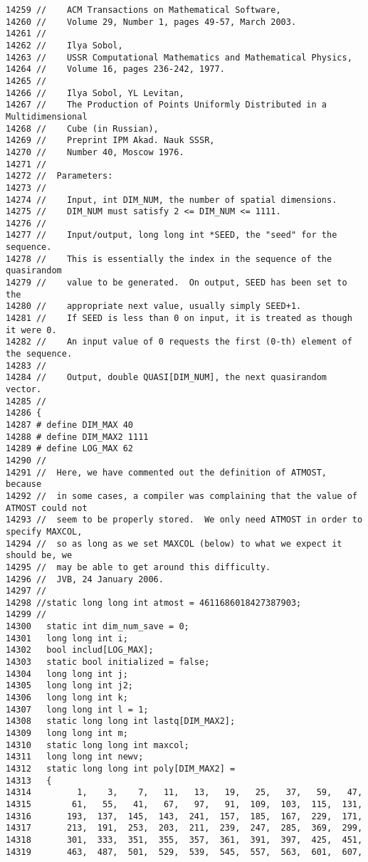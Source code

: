 \begin{Code}
\begin{verbatim}
14259 //    ACM Transactions on Mathematical Software,
14260 //    Volume 29, Number 1, pages 49-57, March 2003.
14261 //
14262 //    Ilya Sobol,
14263 //    USSR Computational Mathematics and Mathematical Physics,
14264 //    Volume 16, pages 236-242, 1977.
14265 //
14266 //    Ilya Sobol, YL Levitan, 
14267 //    The Production of Points Uniformly Distributed in a Multidimensional 
14268 //    Cube (in Russian),
14269 //    Preprint IPM Akad. Nauk SSSR, 
14270 //    Number 40, Moscow 1976.
14271 //
14272 //  Parameters:
14273 //
14274 //    Input, int DIM_NUM, the number of spatial dimensions.
14275 //    DIM_NUM must satisfy 2 <= DIM_NUM <= 1111.
14276 //
14277 //    Input/output, long long int *SEED, the "seed" for the sequence.
14278 //    This is essentially the index in the sequence of the quasirandom
14279 //    value to be generated.  On output, SEED has been set to the
14280 //    appropriate next value, usually simply SEED+1.
14281 //    If SEED is less than 0 on input, it is treated as though it were 0.
14282 //    An input value of 0 requests the first (0-th) element of the sequence.
14283 //
14284 //    Output, double QUASI[DIM_NUM], the next quasirandom vector.
14285 //
14286 {
14287 # define DIM_MAX 40
14288 # define DIM_MAX2 1111
14289 # define LOG_MAX 62
14290 //
14291 //  Here, we have commented out the definition of ATMOST, because
14292 //  in some cases, a compiler was complaining that the value of ATMOST could not
14293 //  seem to be properly stored.  We only need ATMOST in order to specify MAXCOL,
14294 //  so as long as we set MAXCOL (below) to what we expect it should be, we
14295 //  may be able to get around this difficulty.
14296 //  JVB, 24 January 2006.
14297 //
14298 //static long long int atmost = 4611686018427387903;
14299 //
14300   static int dim_num_save = 0;
14301   long long int i;
14302   bool includ[LOG_MAX];
14303   static bool initialized = false;
14304   long long int j;
14305   long long int j2;
14306   long long int k;
14307   long long int l = 1;
14308   static long long int lastq[DIM_MAX2];
14309   long long int m;
14310   static long long int maxcol;
14311   long long int newv;
14312   static long long int poly[DIM_MAX2] =
14313   {
14314         1,    3,    7,   11,   13,   19,   25,   37,   59,   47,
14315        61,   55,   41,   67,   97,   91,  109,  103,  115,  131,
14316       193,  137,  145,  143,  241,  157,  185,  167,  229,  171,
14317       213,  191,  253,  203,  211,  239,  247,  285,  369,  299,
14318       301,  333,  351,  355,  357,  361,  391,  397,  425,  451,
14319       463,  487,  501,  529,  539,  545,  557,  563,  601,  607,

\end{verbatim}
\end{Code}
